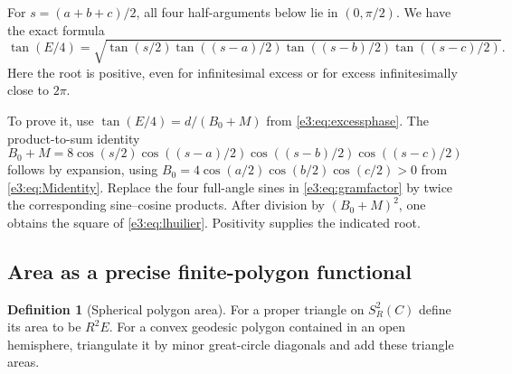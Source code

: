 \documentclass[11pt,letterpaper]{article}
\numberwithin{equation}{section}
\theoremstyle{definition}
\newtheorem{definition}[definition]{Definition}
\theoremstyle{remark}
\begin{document}
For $s=(a+b+c)/2$, all four half-arguments below lie in $(0,\pi/2)$.
We have the exact formula
\begin{equation}\label{e3:eq:lhuilier}
 \tan(E/4)=\sqrt{
 \tan(s/2)\tan((s-a)/2)\tan((s-b)/2)\tan((s-c)/2)}.
\end{equation}
Here the root is positive, even for infinitesimal excess or for excess
infinitesimally close to $2\pi$.

To prove it, use $\tan(E/4)=d/(B_0+M)$ from
\cref{e3:eq:excessphase}. The product-to-sum identity
\[
 B_0+M=8\cos(s/2)\cos((s-a)/2)
               \cos((s-b)/2)\cos((s-c)/2)
\]
follows by expansion, using
$B_0=4\cos(a/2)\cos(b/2)\cos(c/2)>0$ from
\cref{e3:eq:Midentity}. Replace the four full-angle sines in
\cref{e3:eq:gramfactor} by twice the corresponding sine--cosine products.
After division by $(B_0+M)^2$, one obtains the square of
\cref{e3:eq:lhuilier}. Positivity supplies the indicated root.

\subsection{Area as a precise finite-polygon functional}

\begin{definition}[Spherical polygon area]\label{e3:def:area}
For a proper triangle on $S_R^2(C)$ define its area to be $R^2E$.
For a convex geodesic polygon contained in an open hemisphere, triangulate
it by minor great-circle diagonals and add these triangle areas.
\end{definition}
\end{document}
